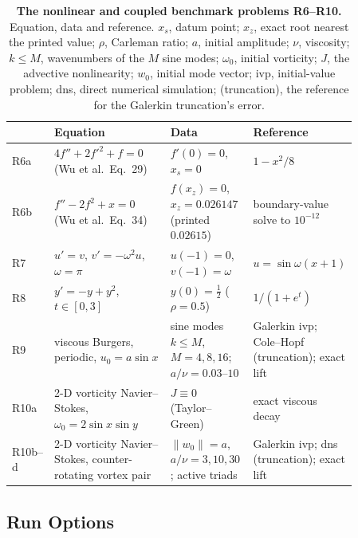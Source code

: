 \begin{table}[htbp]
    \centering
    \caption[The nonlinear and coupled benchmark problems R6--R10]{\textbf{The nonlinear and coupled benchmark problems R6--R10.} Equation, data and reference. $x_s$, datum point; $x_z$, exact root nearest the printed value; $\rho$, Carleman ratio; $a$, initial amplitude; $\nu$, viscosity; $k\le M$, wavenumbers of the $M$ sine modes; $\omega_0$, initial vorticity; $J$, the advective nonlinearity; $w_0$, initial mode vector; \gls{ivp}, initial-value problem; \gls{dns}, direct numerical simulation; (truncation), the reference for the Galerkin truncation's error.}
    \label{tab:catalogue-nonlinear}
    \small
    \begin{tabular}{@{}l p{0.34\linewidth} p{0.24\linewidth} p{0.28\linewidth}@{}}
        \toprule
        & Equation & Data & Reference \\
        \midrule
        R6a & $4f'' + 2f'^2 + f = 0$ (Wu et al.\ Eq.~29) & $f'(0) = 0$, $x_s = 0$ & $1 - x^2/8$ \\
        R6b & $f'' - 2f^2 + x = 0$ (Wu et al.\ Eq.~34) & $f(x_z) = 0$, $x_z = 0.026147$ (printed $0.02615$) & boundary-value solve to $10^{-12}$ \\
        R7  & $u' = v$, $v' = -\omega^2 u$, $\omega = \pi$ & $u(-1) = 0$, $v(-1) = \omega$ & $u = \sin\omega(x+1)$ \\
        R8  & $y' = -y + y^2$, $t \in [0, 3]$ & $y(0) = \tfrac12$ ($\rho = 0.5$) & $1/(1 + e^{t})$ \\
        R9  & viscous Burgers, periodic, $u_0 = a\sin x$ & sine modes $k \le M$, $M = 4, 8, 16$; $a/\nu = 0.03$--$10$ & Galerkin \gls{ivp}; Cole--Hopf (truncation); exact lift \\
        R10a & 2-D vorticity Navier--Stokes, $\omega_0 = 2\sin x\sin y$ & $J \equiv 0$ (Taylor--Green) & exact viscous decay \\
        R10b--d & 2-D vorticity Navier--Stokes, counter-rotating vortex pair & $\|w_0\| = a$, $a/\nu = 3, 10, 30$; active triads & Galerkin \gls{ivp}; \gls{dns} (truncation); exact lift \\
        \bottomrule
    \end{tabular}
\end{table}

\subsection{Run Options}
\label{app:run-options}

